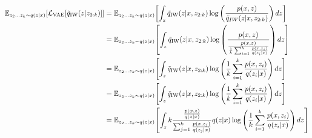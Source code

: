 \documentclass{article} %
\begin{document}
\begin{align}
    \mathbb{E}_{z_{2} \dots z_{k}\sim q(z|x)} \! \left[ \mathcal{L}_{\textnormal{VAE}}[\tilde{q}_{\textnormal{IW}}(z|z_{2:k})] \right] 
    &= \mathbb{E}_{z_{2} \dots z_{k} \sim q(z|x)} \!\left[ \int_{z} \tilde{q}_{\textnormal{IW}}(z|x,z_{2:k})  \log\left(\frac{p(x,z)}{\tilde{q}_{IW}(z|x,z_{2:k})} \right)  dz \right] \\
    &= \mathbb{E}_{z_{2} \dots z_{k} \sim q(z|x)} \!\left[ \int_{z} \tilde{q}_{\textnormal{IW}}(z|x,z_{2:k})  \log\left(\frac{p(x,z)}{\frac{p(x,z)}{\frac{1}{k}   \sum_{i=1}^k \frac{p(x,z_i)}{q(z_i|x)}}} \right)  dz \right] \\
    &= \mathbb{E}_{z_{2} \dots z_{k} \sim q(z|x)} \!\left[ \int_{z} \tilde{q}_{\textnormal{IW}}(z|x,z_{2:k}) \log\left(\frac{1}{k}   \sum_{i=1}^k \frac{p(x,z_i)}{q(z_i|x)} \right)  dz \right] \\
    &= \mathbb{E}_{z_{2} \dots z_{k} \sim q(z|x)} \!\left[\int_z  \tilde{q}_{\textnormal{IW}}(z|x,z_{2:k}) \log\left(\frac{1}{k}   \sum_{i=1}^k \frac{p(x,z_i)}{q(z_i|x)} \right)  dz \right]  \\
    &= \mathbb{E}_{z_{2} \dots z_{k} \sim q(z|x)} \!\left[\int_z  k \frac{\frac{p(x,z)}{q(z|x)}}{\sum_{j=1}^k \frac{p(x,z_j)}{q(z_j|x)}} q(z|x) \log\left(\frac{1}{k}   \sum_{i=1}^k \frac{p(x,z_i)}{q(z_i|x)} \right)  dz \right]  \\

\end{align}
\end{document}

